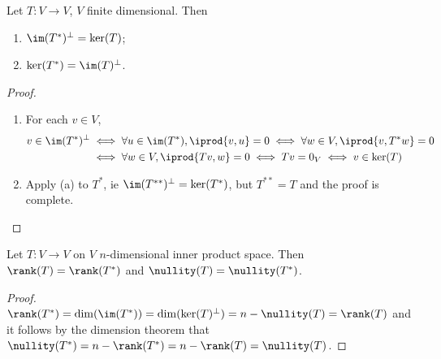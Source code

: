 \begin{proposition}
    Let $T : V \to V$, $V$ finite dimensional. Then \begin{enumerate}[label=(\alph*)]
        \item $\im(T^\ast)^\perp = \ker(T)$;
        \item $\ker(T^\ast) = \im(T)^\perp$.
    \end{enumerate}
\end{proposition}
\begin{proof}
    \begin{enumerate}[label=(\alph*)]
        Remark that because $\dim(V) < \infty, \im(T^\ast) = \ker(T)^\perp \iff \im(T^\ast)^\perp = \ker(T)$.

        \item For each $v \in V$, \begin{align*}
            v \in \im(T^\ast)^\perp &\iff \forall u \in \im(T^\ast), \iprod{v, u} = 0 \iff \forall w \in V, \iprod{v, T^\ast w} = 0\\
            &\iff \forall w \in V, \iprod{Tv, w} = 0 \iff Tv = 0_V \iff v \in \ker(T)
        \end{align*}
        \item Apply (a) to $T^\ast$, ie $\im(T^{\ast \ast})^\perp = \ker(T^\ast)$, but $T^{\ast \ast} = T$ and the proof is complete.
    \end{enumerate}
\end{proof}

\begin{corollary}
    Let $T : V \to V$ on $V$ $n$-dimensional inner product space. Then $\rank(T) = \rank(T^\ast)$ and $\nullity(T)=\nullity(T^\ast)$.
\end{corollary}

\begin{proof}
    $\rank(T^\ast) = \dim(\im(T^\ast)) = \dim(\ker(T)^\perp) = n - \nullity(T) = \rank(T)$ and it follows by the dimension theorem that $\nullity(T^\ast) = n - \rank(T^\ast) = n - \rank(T) = \nullity(T)$.
\end{proof}